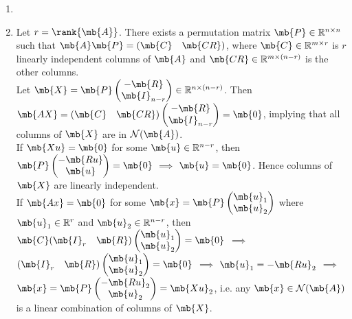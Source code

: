 \begin{exercise}
\begin{enumerate}
			\begin{solution}
				\begin{enumerate}
					\item []
					\item
						Let $r=\rank{\mb{A}}$. There exists a permutation matrix $\mb{P}\in \mathbb{R}^{n\times n}$ such that $\mb{A}\mb{P}=(\mb{C}\quad\mb{CR})$, where $\mb{C}\in \mathbb{R}^{m\times r}$ is $r$ linearly independent columns of $\mb{A}$ and $\mb{CR}\in \mathbb{R}^{m\times (n-r)}$ is the other columns.
						\\
						Let $\mb{X}=\mb{P}\begin{pmatrix} -\mb{R} \\ \mb{I}_{n-r} \end{pmatrix}\in \mathbb{R}^{n\times (n-r)}$.
						Then $\mb{AX}=(\mb{C}\quad\mb{CR})\begin{pmatrix} -\mb{R} \\ \mb{I}_{n-r} \end{pmatrix}=\mb{0}$, implying that all columns of $\mb{X}$ are in $\mathcal{N}(\mb{A})$.
						\\
						If $\mb{Xu}=\mb{0}$ for some $\mb{u}\in \mathbb{R}^{n-r}$, then $\mb{P}\begin{pmatrix} -\mb{Ru} \\ \mb{u} \end{pmatrix} = \mb{0}$ $\implies$ $\mb{u}=\mb{0}$.
						Hence columns of $\mb{X}$ are linearly independent.
						\\
						If $\mb{Ax}=\mb{0} $ for some $\mb{x}=\mb{P}\begin{pmatrix} \mb{u}_1 \\ \mb{u}_2 \end{pmatrix}$ where $\mb{u}_1\in \mathbb{R}^r$ and $\mb{u}_2\in\mathbb{R}^{n-r}$, then $\mb{C}(\mb{I}_r\quad\mb{R}) \begin{pmatrix} \mb{u}_1 \\ \mb{u}_2 \end{pmatrix} = \mb{0}$ $\implies$ $(\mb{I}_r\quad\mb{R}) \begin{pmatrix} \mb{u}_1 \\ \mb{u}_2 \end{pmatrix} = \mb{0}$ $\implies$ $\mb{u}_1 = -\mb{Ru}_2$ $\implies$ $\mb{x}=\mb{P}\begin{pmatrix} -\mb{Ru}_2 \\ \mb{u}_2 \end{pmatrix}=\mb{Xu}_2$, i.e. any $\mb{x}\in \mathcal{N}(\mb{A})$ is a linear combination of columns of $\mb{X}$.
						\\

\end{enumerate}
\end{solution}
\end{enumerate}
\end{exercise}
